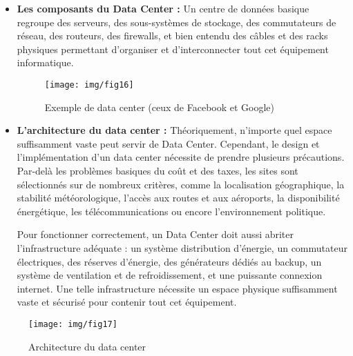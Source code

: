 \begin{itemize}
\item  \textbf{Les composants du Data Center :} Un centre de données basique regroupe des serveurs, des sous-systèmes de stockage, des commutateurs de réseau, des routeurs, des firewalls, et bien entendu des câbles et des racks physiques permettant d'organiser et d'interconnecter tout cet équipement informatique.
\begin{figure}[h]
	\centering
	\texttt{[image: img/fig16]}
	\caption{Exemple de data center (ceux de Facebook et Google)}
\end{figure}
\bigskip \bigskip \bigskip \bigskip
\item  \textbf{L'architecture du data center :} Théoriquement, n'importe quel espace suffisamment vaste peut servir de Data Center. Cependant, le design et l'implémentation d'un data center nécessite de prendre plusieurs précautions. Par-delà les problèmes basiques du coût et des taxes, les sites sont sélectionnés sur de nombreux critères, comme la localisation géographique, la stabilité météorologique, l'accès aux routes et aux aéroports, la disponibilité énergétique, les télécommunications ou encore l'environnement politique.

Pour fonctionner correctement, un Data Center doit aussi abriter l'infrastructure adéquate : un système distribution d'énergie, un commutateur électriques, des réserves d'énergie, des générateurs dédiés au backup, un système de ventilation et de refroidissement, et une puissante connexion internet. Une telle infrastructure nécessite un espace physique suffisamment vaste et sécurisé pour contenir tout cet équipement.
\end{itemize}
\begin{figure}[h]
	\centering
	\texttt{[image: img/fig17]}
	\caption{Architecture du data center}
\end{figure}




